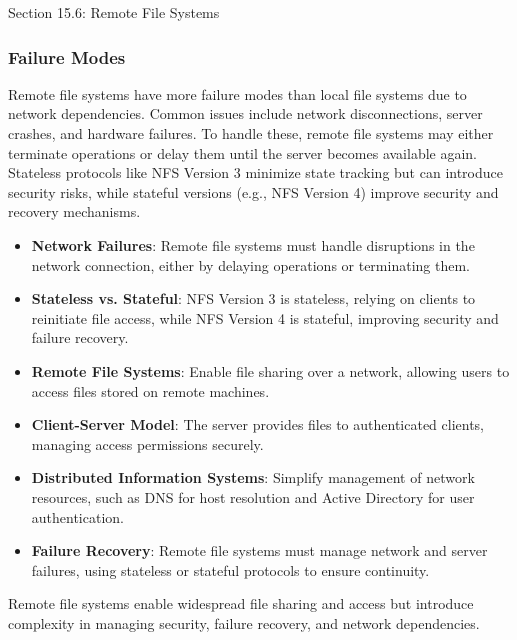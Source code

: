 \begin{notes}{Section 15.6: Remote File Systems}
    \subsubsection*{Failure Modes}
    
    Remote file systems have more failure modes than local file systems due to network dependencies. Common issues include network disconnections, server crashes, and hardware failures. To handle these, 
    remote file systems may either terminate operations or delay them until the server becomes available again. Stateless protocols like NFS Version 3 minimize state tracking but can introduce security 
    risks, while stateful versions (e.g., NFS Version 4) improve security and recovery mechanisms.
    
    \begin{highlight}
    
        \begin{itemize}
            \item \textbf{Network Failures}: Remote file systems must handle disruptions in the network connection, either by delaying operations or terminating them.
            \item \textbf{Stateless vs. Stateful}: NFS Version 3 is stateless, relying on clients to reinitiate file access, while NFS Version 4 is stateful, improving security and failure recovery.
        \end{itemize}
    
    \end{highlight}
    
    \begin{highlight}
    
        \begin{itemize}
            \item \textbf{Remote File Systems}: Enable file sharing over a network, allowing users to access files stored on remote machines.
            \item \textbf{Client-Server Model}: The server provides files to authenticated clients, managing access permissions securely.
            \item \textbf{Distributed Information Systems}: Simplify management of network resources, such as DNS for host resolution and Active Directory for user authentication.
            \item \textbf{Failure Recovery}: Remote file systems must manage network and server failures, using stateless or stateful protocols to ensure continuity.
        \end{itemize}
    
    Remote file systems enable widespread file sharing and access but introduce complexity in managing security, failure recovery, and network dependencies.
    
    \end{highlight}
\end{notes}

